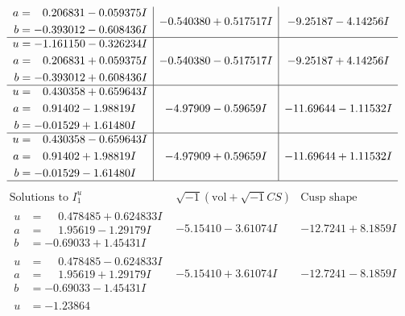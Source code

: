 \documentclass[1p]{elsarticle_modified}
\theoremstyle{definition}
\newcommand{\I}{\sqrt{-1}}
\begin{document}
$$\begin{array}{c|c|c}
\begin{aligned}
a &= \phantom{-}0.206831 - 0.059375 I \\
b &= -0.393012 - 0.608436 I\end{aligned}
 & -0.540380 + 0.517517 I & -9.25187 - 4.14256 I \\ \hline\begin{aligned}
u &= -1.161150 - 0.326234 I \\
a &= \phantom{-}0.206831 + 0.059375 I \\
b &= -0.393012 + 0.608436 I\end{aligned}
 & -0.540380 - 0.517517 I & -9.25187 + 4.14256 I \\ \hline\begin{aligned}
u &= \phantom{-}0.430358 + 0.659643 I \\
a &= \phantom{-}0.91402 - 1.98819 I \\
b &= -0.01529 + 1.61480 I\end{aligned}
 & -4.97909 - 0.59659 I & -11.69644 - 1.11532 I \\ \hline\begin{aligned}
u &= \phantom{-}0.430358 - 0.659643 I \\
a &= \phantom{-}0.91402 + 1.98819 I \\
b &= -0.01529 - 1.61480 I\end{aligned}
 & -4.97909 + 0.59659 I & -11.69644 + 1.11532 I\\
 \hline 
 \end{array}$$\newpage$$\begin{array}{c|c|c}  
\text{Solutions to }I^u_{1}& \I (\text{vol} + \sqrt{-1}CS) & \text{Cusp shape}\\
 \hline 
\begin{aligned}
u &= \phantom{-}0.478485 + 0.624833 I \\
a &= \phantom{-}1.95619 - 1.29179 I \\
b &= -0.69033 + 1.45431 I\end{aligned}
 & -5.15410 - 3.61074 I & -12.7241 + 8.1859 I \\ \hline\begin{aligned}
u &= \phantom{-}0.478485 - 0.624833 I \\
a &= \phantom{-}1.95619 + 1.29179 I \\
b &= -0.69033 - 1.45431 I\end{aligned}
 & -5.15410 + 3.61074 I & -12.7241 - 8.1859 I \\ \hline\begin{aligned}
u &= -1.23864\phantom{ +0.000000I} \\

\end{aligned}
\end{array}$$
\end{document}
